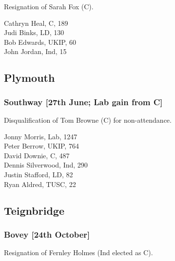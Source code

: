\documentclass[a4paper,openany,10pt]{book}
\begin{document}

Resignation of Sarah Fox (C).



Cathryn Heal, C, 189\\
Judi Binks, LD, 130\\
Bob Edwards, UKIP, 60\\
John Jordan, Ind, 15\\


\subsection*{Plymouth}

\subsubsection*{Southway \hspace*{\fill}\nolinebreak[1]%
\enspace\hspace*{\fill}
[27th June; Lab gain from C]}


Disqualification of Tom Browne (C) for non-attendance.



Jonny Morris, Lab, 1247\\
Peter Berrow, UKIP, 764\\
David Downie, C, 487\\
Dennis Silverwood, Ind, 290\\
Justin Stafford, LD, 82\\
Ryan Aldred, TUSC, 22\\


\subsection*{Teignbridge}

\subsubsection*{Bovey \hspace*{\fill}\nolinebreak[1]%
\enspace\hspace*{\fill}
[24th October]}


Resignation of Fernley Holmes (Ind elected as C).
\end{document}
